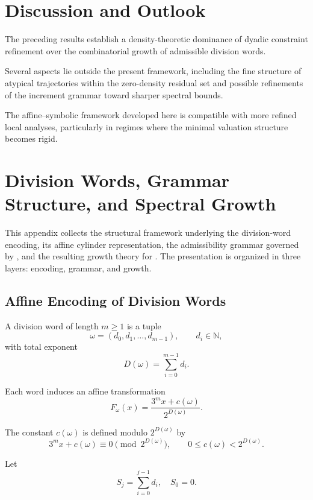 \documentclass[12pt, oneside]{article}
\numberwithin{equation}{section}
\theoremstyle{definition}
\theoremstyle{plain}
\theoremstyle{remark}
\begin{document}
\section{Discussion and Outlook}

The preceding results establish a density-theoretic dominance of
dyadic constraint refinement over the combinatorial growth of admissible
division words.

Several aspects lie outside the present framework, including the
fine structure of atypical trajectories within the zero-density residual
set and possible refinements of the increment grammar toward sharper
spectral bounds.

The affine–symbolic framework developed here is compatible with
more refined local analyses, particularly in regimes where the
minimal valuation structure becomes rigid.

\newpage
\appendix
\section{Division Words, Grammar Structure, and Spectral Growth}
\label{app:spine}

This appendix collects the structural framework underlying the division-word encoding,
its affine cylinder representation, the admissibility grammar governed by ,
and the resulting growth theory for . The presentation is organized in three layers:
encoding, grammar, and growth.

\subsection{Affine Encoding of Division Words}
\label{app:spine-affine}

A division word of length $m \ge 1$ is a tuple
\[
\omega = (d_0, d_1, \dots, d_{m-1}), \qquad d_i \in \mathbb{N},
\]
with total exponent
\[
D(\omega) = \sum_{i=0}^{m-1} d_i.
\]

Each word induces an affine transformation
\[
F_\omega(x) = \frac{3^m x + c(\omega)}{2^{D(\omega)}}.
\]

The constant $c(\omega)$ is defined modulo $2^{D(\omega)}$ by
\[
3^m x + c(\omega) \equiv 0 \pmod{2^{D(\omega)}},
\qquad 0 \le c(\omega) < 2^{D(\omega)}.
\]

Let
\[
S_j = \sum_{i=0}^{j-1} d_i, \quad S_0 = 0.
\]
\end{document}
